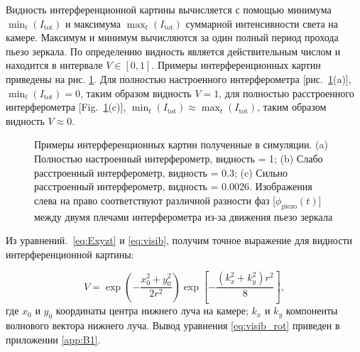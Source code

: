 Видность интерференционной картины вычисляется с помощью минимума $\min_t(I_{\mathrm{tot}})$ и максимума $\max_t(I_{\mathrm{tot}})$ суммарной интенсивности света на камере. Максимум и минимум вычисляются за один полный период прохода пьезо зеркала. По определению видность является действительным числом и находится в интервале $V \in [0, 1]$. Примеры интерференционных картин приведены на рис. \ref{fig:visib_expl}. Для полностью настроенного интерферометра [рис.~\ref{fig:visib_expl}(a)], $\min_t(I_{\mathrm{tot}})=0$, таким образом видность $V=1$, для полностью расстроенного интерферометра [Fig.~\ref{fig:visib_expl}(c)], $\min_t(I_{\mathrm{tot}})\approx\max_t(I_{\mathrm{tot}})$, таким образом видность $V\approx 0$.

\begin{figure}[ht]
\caption{Примеры интерференционных картин полученные в симуляции. (a) Полностью настроенный интерферометр, видность = 1; (b) Слабо расстроенный интерферометр, видность = 0.3; (c) Сильно расстроенный интерферометр, видность =
0.0026. Изображения слева на право соответствуют различной разности фаз [$\phi_{\mathrm{piezo}}(t)$] между двумя плечами интерферометра из-за движения пьезо зеркала}
\label{fig:visib_expl}
\end{figure}


Из уравнений.~\eqref{eq:Exyzt} и \eqref{eq:visib}, получим точное выражение для видности интерференционной картины:

\begin{equation}
    V = \exp\left(- \frac{x_0^2 + y_0^2}{2 r^2}\right)  \exp\left[- \frac{(k_x^2 + k_y^2) r^2}{8}\right],
    \label{eq:visib_rot}
\end{equation}
где $x_0$ и $y_0$ координаты центра нижнего луча на камере; $k_x$ и $k_y$ компоненты волнового вектора нижнего луча. Вывод уравнения \eqref{eq:visib_rot} приведен в приложении \ref{app:B1}.

